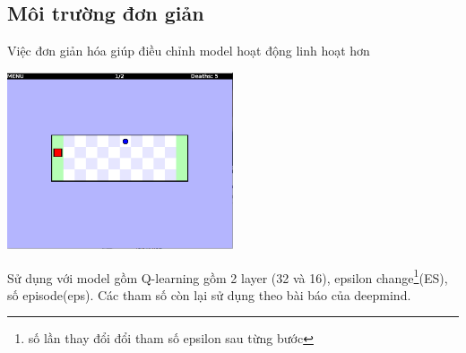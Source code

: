 \documentclass[12pt,a4paper]{article}
\begin{document}
\subsection{Môi trường đơn giản}
Việc đơn giản hóa giúp điều chỉnh model hoạt động linh hoạt hơn\\
\begin{center}
\includegraphics[width=0.5\textwidth]{photo/ThesisRES/1eUp.png}\\
\end{center}
Sử dụng với model gồm Q-learning gồm 2 layer (32 và 16), epsilon change\footnote{số lần thay đổi đổi tham số epsilon sau từng bước}(ES), số episode(eps). Các tham số còn lại sử dụng theo bài báo của deepmind.
\end{document}
